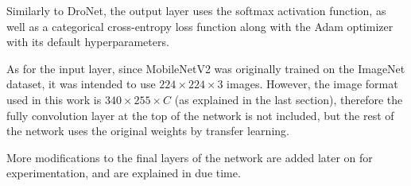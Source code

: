 Similarly to DroNet, the output layer uses the softmax activation function, as
well as a categorical cross-entropy loss function along with the Adam optimizer
with its default hyperparameters.

As for the input layer, since MobileNetV2 was originally trained on the
ImageNet dataset, it was intended to use $224\times224\times3$ images. However,
the image format used in this work is $340\times255\times C$ (as explained in
the last section), therefore the fully convolution layer at the top of the
network is not included, but the rest of the network uses the original weights
by transfer learning.

More modifications to the final layers of the network are added later on for
experimentation, and are explained in due time.

